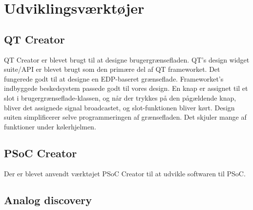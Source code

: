 \chapter{Udviklingsværktøjer}

\section{QT Creator}
QT Creator er blevet brugt til at designe brugergrænsefladen.
QT's design widget suite/API er blevet brugt som den primære del af QT frameworket. Det fungerede godt til at designe en EDP-baseret grænseflade. Frameworket's indbyggede beskedsystem passede godt til vores design.
En knap er assignet til et slot i brugergrænseflade-klassen, og når der trykkes på den pågældende knap, bliver det assignede signal broadcastet, og slot-funktionen bliver kørt.
Design suiten simplificerer selve programmeringen af grænsefladen. Det skjuler mange af funktioner under kølerhjelmen.

\section{PSoC Creator}
Der er blevet anvendt værktøjet PSoC Creator til at udvikle softwaren til PSoC. 

\section{Analog discovery}
